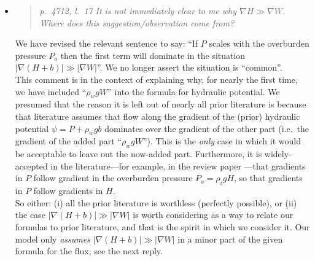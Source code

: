 \documentclass[11pt,reqno]{amsart}
\newcommand{\reply}[2]{
\medskip\medskip
\item  \begin{quote}
\emph{#1}
\end{quote}

\medskip
\noindent #2}
\begin{document}
\begin{itemize}
\reply{p.~4712, l.~17 It is not immediately clear to me why $\nabla H \gg \nabla W$. Where does this suggestion/observation come from?}
{We have revised the relevant sentence to say: ``If $P$ scales with the overburden pressure $P_o$ then the first term will dominate in the situation $|\nabla (H+b)| \gg |\nabla W|$''.  We no longer assert the situation is ``common''.\\
\indent This comment is in the context of explaining why, for nearly the first time, we have included ``$\rho_w g W$'' into the formula for hydraulic potential.  We presumed that the reason it is left out of nearly all prior literature is because that literature assumes that flow along the gradient of the (prior) hydraulic potential $\psi = P + \rho_w g b$ dominates over the gradient of the other part (i.e.~the gradient of the added part ``$\rho_w g W$'').  This is the \emph{only} case in which it would be acceptable to leave out the now-added part.  Furthermore, it is widely-accepted in the literature---for example, in the review paper \cite{Clarke05}---that gradients in $P$ follow gradient in the overburden pressure $P_o=\rho_i g H$, so that gradients in $P$ follow gradients in $H$.  \\
\indent So either: (i) all the prior literature is worthless (perfectly possible), or (ii) the case $|\nabla (H+b)| \gg |\nabla W|$ is worth considering as a way to relate our formulas to prior literature, and that is the spirit in which we consider it.  Our model only \emph{assumes} $|\nabla (H+b)| \gg |\nabla W|$ in a minor part of the given formula for the flux; see the next reply.}


\end{itemize}
\end{document}
